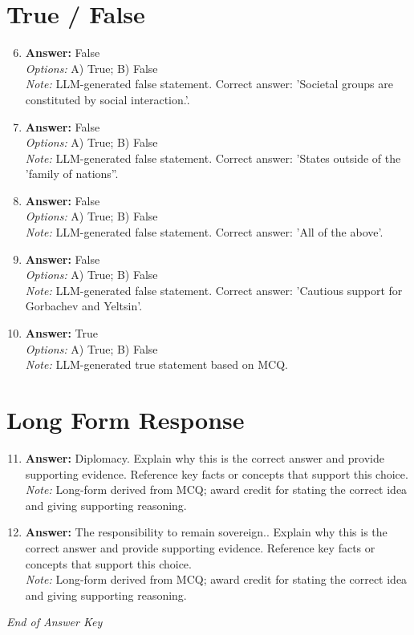 \documentclass[12pt]{article}
\begin{document}
\section*{True / False}
\begin{enumerate}[label=\arabic*.]
\setcounter{enumi}{5}
\item \textbf{Answer:} False
\\ \textit{Options:} A) True; B) False
\\ \textit{Note:} LLM-generated false statement. Correct answer: 'Societal groups are constituted by social interaction.'.
\item \textbf{Answer:} False
\\ \textit{Options:} A) True; B) False
\\ \textit{Note:} LLM-generated false statement. Correct answer: 'States outside of the 'family of nations''.
\item \textbf{Answer:} False
\\ \textit{Options:} A) True; B) False
\\ \textit{Note:} LLM-generated false statement. Correct answer: 'All of the above'.
\item \textbf{Answer:} False
\\ \textit{Options:} A) True; B) False
\\ \textit{Note:} LLM-generated false statement. Correct answer: 'Cautious support for Gorbachev and Yeltsin'.
\item \textbf{Answer:} True
\\ \textit{Options:} A) True; B) False
\\ \textit{Note:} LLM-generated true statement based on MCQ.
\end{enumerate}

\section*{Long Form Response}
\begin{enumerate}[label=\arabic*.]
\setcounter{enumi}{10}
\item \textbf{Answer:} Diplomacy. Explain why this is the correct answer and provide supporting evidence. Reference key facts or concepts that support this choice.
\\ \textit{Note:} Long-form derived from MCQ; award credit for stating the correct idea and giving supporting reasoning.
\item \textbf{Answer:} The responsibility to remain sovereign.. Explain why this is the correct answer and provide supporting evidence. Reference key facts or concepts that support this choice.
\\ \textit{Note:} Long-form derived from MCQ; award credit for stating the correct idea and giving supporting reasoning.
\end{enumerate}

\vfill
\noindent\textit{End of Answer Key}
\end{document}

